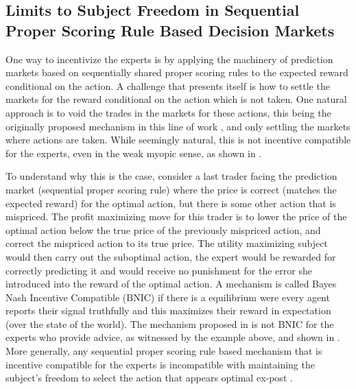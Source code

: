 

\subsection{Limits to Subject Freedom in Sequential Proper Scoring Rule Based Decision Markets}

One way to incentivize the experts is by applying the machinery of prediction markets based on sequentially shared proper scoring rules to the expected reward conditional on the action.
A challenge that presents itself is how to settle the markets for the reward conditional on the action which is not taken.
One natural approach is to void the trades in the markets for these actions, this being the originally proposed mechanism in this line of work \citep{hanson2002decision}, and only settling the markets where actions are taken.
While seemingly natural, this is not incentive compatible for the experts, even in the weak myopic sense, as shown in \citep{othman2010decision}. 

To understand why this is the case, consider a last trader facing the prediction market (sequential proper scoring rule)  where the  price is correct (matches the expected reward) for the optimal action, but there is some other action that is mispriced. The profit maximizing move for this trader is to lower the price of the optimal action below the true price of the previously mispriced action, and correct the mispriced action to its true  price. 
The utility maximizing subject would then carry out the suboptimal action, the expert would be rewarded for correctly predicting it and would receive no punishment for the error she introduced into the reward of the optimal action. 
A mechanism is called Bayes Nash Incentive Compatible (BNIC) if there is a equilibrium were every agent reports their signal truthfully and this maximizes their reward in expectation (over the state of the world).
The mechanism proposed in \citep{hanson2002decision} is not BNIC for the experts who provide advice, as witnessed by the example above, and shown in \citep{othman2010decision,chen2014eliciting}.
More generally, any sequential proper scoring rule based mechanism that is incentive compatible for the experts is incompatible with maintaining the subject's freedom to select the action that appears optimal ex-post \citep{ chen2014eliciting}. 

